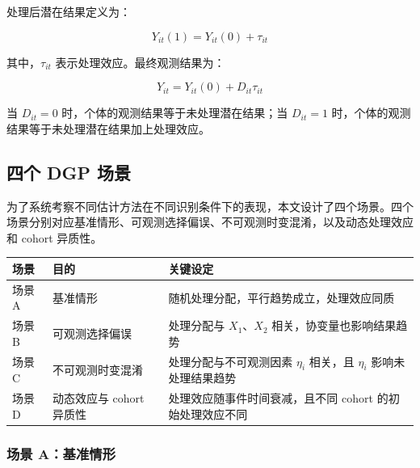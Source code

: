 \documentclass[
  fontset=windows]{ctexart}
\newcounter{none} %
\begin{document}
处理后潜在结果定义为：

\[
Y_{it}(1)=Y_{it}(0)+\tau_{it}
\]

其中，\(\tau_{it}\) 表示处理效应。最终观测结果为：

\[
Y_{it}=Y_{it}(0)+D_{it}\tau_{it}
\]

当 \(D_{it}=0\) 时，个体的观测结果等于未处理潜在结果；当 \(D_{it}=1\)
时，个体的观测结果等于未处理潜在结果加上处理效应。

\subsection{四个 DGP 场景}\label{ux56dbux4e2a-dgp-ux573aux666f}

为了系统考察不同估计方法在不同识别条件下的表现，本文设计了四个场景。四个场景分别对应基准情形、可观测选择偏误、不可观测时变混淆，以及动态处理效应和
cohort 异质性。

{\def\LTcaptype{none} %
\begin{longtable}[]{@{}
  >{\raggedright\arraybackslash}p{}
  >{\raggedright\arraybackslash}p{}
  >{\raggedright\arraybackslash}p{}@{}}
\toprule\noalign{}
\begin{minipage}[b]{\linewidth}\raggedright
场景
\end{minipage} & \begin{minipage}[b]{\linewidth}\raggedright
目的
\end{minipage} & \begin{minipage}[b]{\linewidth}\raggedright
关键设定
\end{minipage} \\
\midrule\noalign{}
\endhead
\bottomrule\noalign{}
\endlastfoot
场景 A & 基准情形 & 随机处理分配，平行趋势成立，处理效应同质 \\
场景 B & 可观测选择偏误 & 处理分配与 \(X_1\)、\(X_2\)
相关，协变量也影响结果趋势 \\
场景 C & 不可观测时变混淆 & 处理分配与不可观测因素 \(\eta_i\) 相关，且
\(\eta_i\) 影响未处理结果趋势 \\
场景 D & 动态效应与 cohort 异质性 & 处理效应随事件时间衰减，且不同
cohort 的初始处理效应不同 \\
\end{longtable}
}

\subsubsection{场景
A：基准情形}\label{ux573aux666f-aux57faux51c6ux60c5ux5f62}
\end{document}
